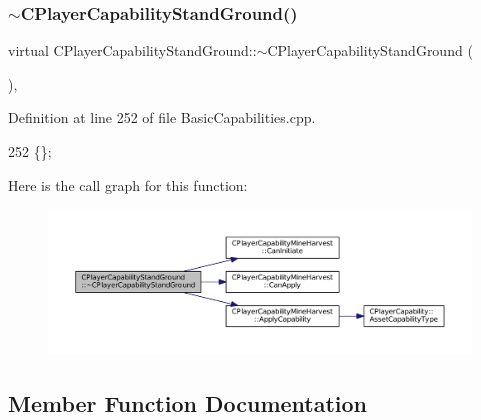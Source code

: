\subsubsection{\texorpdfstring{$\sim$\+C\+Player\+Capability\+Stand\+Ground()}{~CPlayerCapabilityStandGround()}}
{\footnotesize\ttfamily virtual C\+Player\+Capability\+Stand\+Ground\+::$\sim$\+C\+Player\+Capability\+Stand\+Ground (\begin{DoxyParamCaption}{ }\end{DoxyParamCaption})\hspace{0.3cm}{\ttfamily [inline]}, {\ttfamily [virtual]}}



Definition at line 252 of file Basic\+Capabilities.\+cpp.


\begin{DoxyCode}
252 \{\};
\end{DoxyCode}
Here is the call graph for this function\+:
\nopagebreak
\begin{figure}[H]
\begin{center}
\leavevmode
\includegraphics[width=350pt]{classCPlayerCapabilityStandGround_aa09aba607953849ece673feeb27ef6fd_cgraph}
\end{center}
\end{figure}


\subsection{Member Function Documentation}
\hypertarget{classCPlayerCapabilityStandGround_a3e1beee9125b2a940f803c3234866bb2}{}\label{classCPlayerCapabilityStandGround_a3e1beee9125b2a940f803c3234866bb2} 
